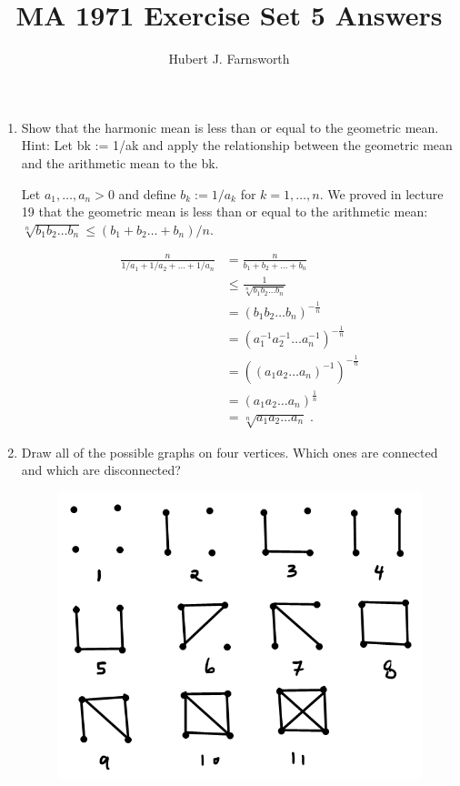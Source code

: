 \documentclass[a4paper]{article}
\title{MA 1971 Exercise Set 5 Answers}
\author{Hubert J. Farnsworth}
\begin{document}
\maketitle

\begin{enumerate}
\item

Show that the harmonic mean is less than or equal to the geometric mean. Hint:
Let bk := 1/ak and apply the relationship between the geometric mean and the
arithmetic mean to the bk.

Let $a_1, \dots , a_n > 0$ and define $b_k := 1/a_k$ for $k = 1, \dots , n$. We proved in lecture 19 that the geometric mean is less than or equal to the arithmetic mean: $\sqrt[n]{b_1b_2 \dots b_n} \leq (b_1 + b_2 \dots + b_n)/n$. 

\begin{align*}
\frac{n}{1/a_1 + 1/a_2 + \dots + 1/a_n} &=
\frac{n}{b_1 + b_2 + \dots + b_n} \\
&\leq \frac{1}{\sqrt[n]{b_1b_2 \dots b_n}} \\
& = (b_1b_2 \dots b_n)^{-\frac{1}{n}} \\ 
&= (a_1^{-1}a_2^{-1} \dots a_n^{-1})^{-\frac{1}{n}} \\
&=((a_1a_2 \dots a_n)^{-1})^{-\frac{1}{n}} \\
&= (a_1a_2 \dots a_n)^{\frac{1}{n}} \\
&= \sqrt[n]{a_1a_2\dots a_n} \;.
\end{align*}


\newpage
\item

Draw all of the possible graphs on four vertices. Which ones are connected and
which are disconnected?

	\begin{figure}[H]
	\centering
  	\includegraphics[width=0.65\linewidth]{HW5Exercise2.png}
	\end{figure}
	

\end{enumerate}
\end{document}

